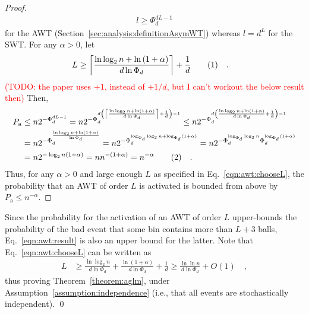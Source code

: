 \documentclass[a4paper,12pt]{article}
\newcommand\todo[1]{\textcolor{red}{(TODO: #1)}}
\newcommand\numberthis{\addtocounter{equation}{1}\tag{\theequation}}
\newcommand\neqn[1]{\numberthis\label{eqn:#1}}
\begin{document}
\begin{proof}
\begin{align*}
l \geq \Phi_d^{d L -1}
\end{align*}
for the AWT (Section~\ref{sec:analysis:definitionAsymWT}) whereas $l = d^L$ for the SWT.
For any $\alpha > 0$, let 
\begin{align*}
L &\geq \left\lceil{\frac{\ln\log_2 n + \ln\left(1+\alpha\right)}{d \ln \Phi_d}}\right\rceil+\frac{1}{d} \neqn{awt:chooseL}\quad .
\end{align*}
\todo{the paper uses $+1$, instead of $+1/d$, but I can't workout the below result then} 
Then, 
\begin{align*}
P_\mathrm{a} &\leq n  2^{-\Phi_d^{d L -1}} 
        = n  2^{-\Phi_d^{d \left(\left\lceil{\frac{\ln\log_2 n + \ln\left(1+\alpha\right)}{d \ln \Phi_d}}\right\rceil+\frac{1}{d}\right) -1}} 
        \leq n  2^{-\Phi_d^{d \left({\frac{\ln\log_2 n + \ln\left(1+\alpha\right)}{d \ln \Phi_d}}+\frac{1}{d}\right) -1}} \\
        &= n  2^{-\Phi_d^{{\frac{\ln\log_2 n + \ln\left(1+\alpha\right)}{\ln \Phi_d}}}} 
        = n  2^{-\Phi_d^{\log_{\Phi_d}\log_2 n + \log_{\Phi_d}\left(1+\alpha\right)}} 
        = n  2^{-\Phi_d^{\log_{\Phi_d}\log_2 n} \Phi_d^{ \log_{\Phi_d}\left(1+\alpha\right)}} \\
         &= n  2^{-\log_2 n \left(1+\alpha\right)} 
         = n  n ^{-(1+\alpha)} = n^{-\alpha} \neqn{awt:result} \quad .
\end{align*}
Thus, for any $\alpha>0$ and large enough $L$ as specified in Eq.~\ref{eqn:awt:chooseL}, the probability that an AWT of order $L$ is activated is bounded from above by $P_\mathrm{a}\leq n^{-\alpha}$.
\end{proof}
Since the probability for the activation of an AWT of order $L$ upper-bounds the probability of the bad event that some bin contains more than $L+3$ balls, Eq.~\ref{eqn:awt:result} is also an upper bound for the latter. Note that Eq.~\ref{eqn:awt:chooseL} can be written as
\begin{align*}
L &\geq \frac{\ln\log_2 n}{d \ln \Phi_d} + \frac{\ln\left(1+\alpha\right)}{d \ln \Phi_d} + \frac{1}{d}
  \geq \frac{\ln\ln n}{d \ln \Phi_d} + O\left(1\right)\quad ,
\end{align*}
thus proving Theorem~\ref{theorem:aglm}, under Assumption~\ref{assumption:independence} (i.e., that all events are stochastically independent). \qed
\end{document}
